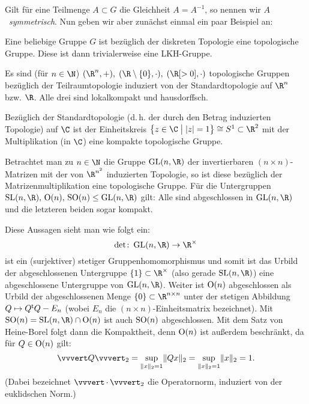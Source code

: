 Gilt für eine Teilmenge $A\subset G$ die Gleichheit $A=A^{-1}$, so nennen wir
$A$~\emph{symmetrisch}. Nun geben wir aber zunächst einmal ein paar Beispiel an:
\begin{BspList}
\item
    Eine beliebige Gruppe $G$ ist bezüglich der diskreten Topologie eine
    topologische Gruppe. Diese ist dann trivialerweise eine LKH-Gruppe.
    
\item
    Es sind (für $n\in\N$) $(\R^n,+),\; (\R\setminus\{0\},\cdot),\; 
    (\R[>0], \cdot)$ topologische Gruppen bezüglich der Teilraumtopologie
    induziert von der Standardtopologie auf $\R^n$ bzw. $\R$. Alle drei sind
    lokalkompakt und hausdorffsch.

\item
    Bezüglich der Standardtopologie (d.\,h. der durch den Betrag induzierten
    Topologie) auf $\C$ ist der Einheitskreis 
    $\left\{ z\in\C \;\big\vert\; \abs{z}=1 \right\} \cong S^1 \subset \R^2$ mit
    der Multiplikation (in $\C$) eine kompakte topologische Gruppe.

\item
    Betrachtet man zu $n\in\N$ die Gruppe $\matGL(n,\R)$ der
    invertierbaren $(n\!\times\!n)$-Matrizen mit der von $\R^{n^2}$ induzierten
    Topologie, so ist diese bezüglich der Matrizenmultiplikation eine
    topologische Gruppe. Für die Untergruppen $\matSL(n,\R),\,\matO(n),\,\matSO(n)
    \leq \matGL(n,\R)$ gilt: Alle sind abgeschlossen in $\matGL(n,\R)$ und
    die letzteren beiden sogar kompakt.
    
    Diese Aussagen sieht man wie folgt ein:
    \[ \det\colon\matGL(n,\R)\to\R^\times 
    \] 
    ist ein (surjektiver) stetiger Gruppenhomomorphismus und somit ist das
    Urbild der abgeschlossenen Untergruppe $\{1\} \subset \R^\times$ (also
    gerade $\matSL(n,\R)$) eine abgeschlossene Untergruppe von $\matGL(n,\R)$.
    Weiter ist $\operatorname{O}(n)$ abgeschlossen als Urbild der abgeschlossenen Menge
    $\{0\} \subset \R^{n\times n}$ unter der stetigen Abbildung $Q\mapsto Q^\mathsf{t} Q - E_n$
    (wobei $E_n$ die $(n\!\times\!n)$-Einheitsmatrix bezeichnet). Mit $\matSO(n)
    = \matSL(n,\R) \cap \matO(n)$ ist auch $\operatorname{SO}(n)$ abgeschlossen.
    Mit dem Satz von Heine-Borel folgt dann die Kompaktheit, denn $\operatorname{O}(n)$ ist
    außerdem beschränkt, da für $Q\in\operatorname{O}(n)$ gilt: 
    \[ \opnorm{Q}_2 = \sup_{\norm{x}_2=1} \norm{Qx}_2 
        = \sup_{\norm{x}_2=1} \norm{x}_2 = 1
    . \]
    (Dabei bezeichnet $\opnorm{\,\cdot\,}_2$ die Operatornorm, induziert von der
    euklidschen Norm.)
    

\end{BspList}
